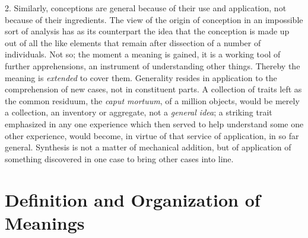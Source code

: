 \documentclass[showtrims,ustradepaper]{memoir}
\begin{document}

2. Similarly, conceptions are general because of their use and
application, not because of their ingredients. The view of the origin of
conception in an impossible sort of analysis has as its counterpart the
idea that the conception is made up out of all the like elements that
remain after dissection of a number of individuals. Not so; the moment a
meaning is gained, it is a working tool of further apprehensions, an
instrument of understanding other things. Thereby the meaning is
\emph{extended} to cover them. Generality resides in application to the
comprehension of new cases, not in constituent parts. A collection of
traits left as the common residuum, the \emph{caput mortuum}, of a
million objects, would be merely a collection, an inventory or
aggregate, not a \emph{general idea}; a striking trait emphasized in any
one experience which then served to help understand some one other
experience, would become, in virtue of that service of application, in
so far general. Synthesis is not a matter of mechanical addition, but of
application of something discovered in one case to bring other cases
into line.

\section*{Definition and Organization of Meanings}



\end{document}
